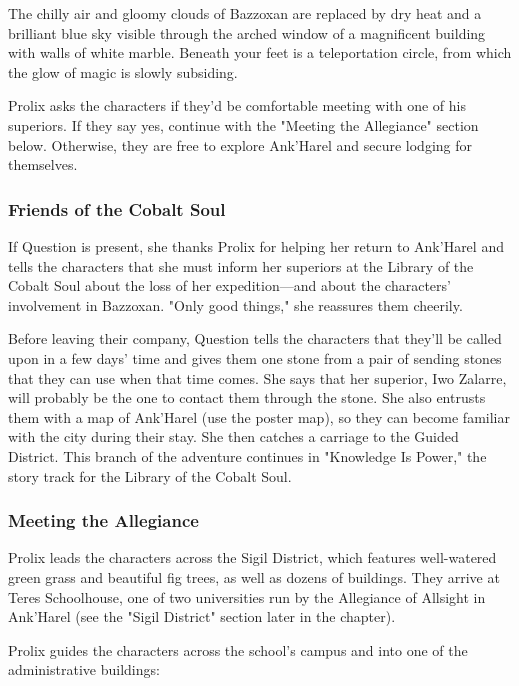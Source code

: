 \documentclass[10pt,a4paper,twoside,bg=print,twocolumn,openany,nodeprecatedcode]{dndbook}
\begin{document}
\begin{DndReadAloud}{}
The chilly air and gloomy clouds of Bazzoxan are replaced by dry heat and a brilliant blue sky visible through the arched window of a magnificent building with walls of white marble. Beneath your feet is a teleportation circle, from which the glow of magic is slowly subsiding.

\end{DndReadAloud}

Prolix asks the characters if they'd be comfortable meeting with one of his superiors. If they say yes, continue with the "Meeting the Allegiance" section below. Otherwise, they are free to explore Ank'Harel and secure lodging for themselves.

\subsubsection{Friends of the Cobalt Soul}
If Question is present, she thanks Prolix for helping her return to Ank'Harel and tells the characters that she must inform her superiors at the Library of the Cobalt Soul about the loss of her expedition—and about the characters' involvement in Bazzoxan. "Only good things," she reassures them cheerily.

Before leaving their company, Question tells the characters that they'll be called upon in a few days' time and gives them one stone from a pair of sending stones that they can use when that time comes. She says that her superior, Iwo Zalarre, will probably be the one to contact them through the stone. She also entrusts them with a map of Ank'Harel (use the poster map), so they can become familiar with the city during their stay. She then catches a carriage to the Guided District. This branch of the adventure continues in "Knowledge Is Power," the story track for the Library of the Cobalt Soul.

\subsubsection{Meeting the Allegiance}
Prolix leads the characters across the Sigil District, which features well-watered green grass and beautiful fig trees, as well as dozens of buildings. They arrive at Teres Schoolhouse, one of two universities run by the Allegiance of Allsight in Ank'Harel (see the "Sigil District" section later in the chapter).

Prolix guides the characters across the school's campus and into one of the administrative buildings:
\end{document}

